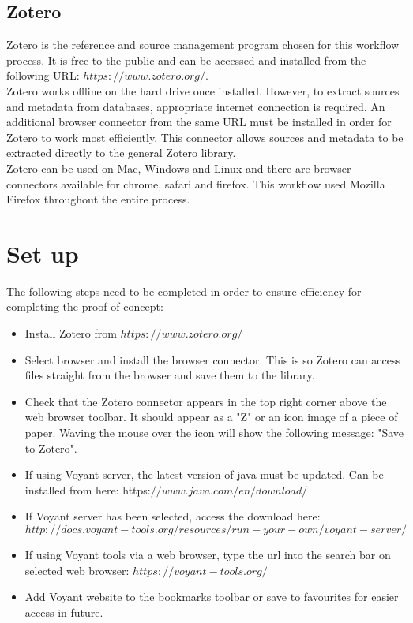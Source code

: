 \documentclass{article}
\begin{document}
\subsection{Zotero}
Zotero is the reference and source management program chosen for this workflow process. It is free to the public and can be accessed and installed from the following URL: $https://www.zotero.org/.$\\
Zotero works offline on the hard drive once installed. However, to extract sources and metadata from databases, appropriate internet connection is required. An additional browser connector from the same URL must be installed in order for Zotero to work most efficiently. This connector allows sources and metadata to be extracted directly to the general Zotero library.\\
Zotero can be used on Mac, Windows and Linux and there are browser connectors available for chrome, safari and firefox. This workflow used Mozilla Firefox throughout the entire process. 


\section{Set up}
The following steps need to be completed in order to ensure efficiency for completing the proof of concept:
\begin{itemize}
    \item Install Zotero from $https://www.zotero.org/$
    \item Select browser and install the browser connector. This is so Zotero can access files straight from the browser and save them to the library.
    \item Check that the Zotero connector appears in the top right corner above the web browser toolbar. It should appear as a "Z" or an icon image of a piece of paper. Waving the mouse over the icon will show the following message: "Save to Zotero". 
    \item If using Voyant server, the latest version of java must be updated. Can be installed from here: https:$//www.java.com/en/download/$
    \item If Voyant server has been selected, access the download here: $http://docs.voyant-tools.org/resources/run-your-own/voyant-server/$
    \item If using Voyant tools via a web browser, type the url into the search bar on selected web browser: $https://voyant-tools.org/$
    \item Add Voyant website to the bookmarks toolbar or save to favourites for easier access in future.
\end{itemize}
\end{document}
